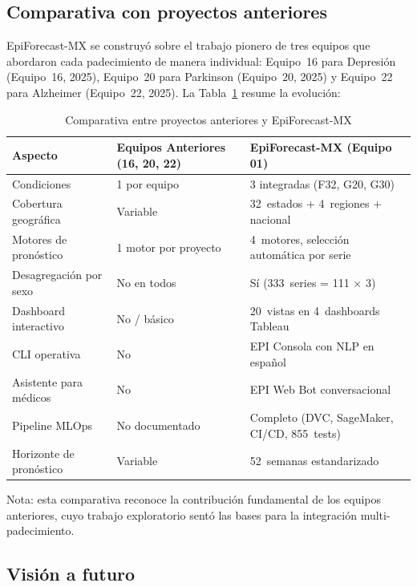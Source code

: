 \documentclass[12pt, letterpaper]{article}
\newcommand{\tabref}[1]{Tabla~\ref{#1}}
\begin{document}
\subsection{Comparativa con proyectos anteriores}

EpiForecast-MX se construyó sobre el trabajo pionero de tres equipos que abordaron cada padecimiento de manera individual: Equipo~16 para Depresión (Equipo~16, 2025), Equipo~20 para Parkinson (Equipo~20, 2025) y Equipo~22 para Alzheimer (Equipo~22, 2025). La \tabref{tab:comparativa} resume la evolución:

\begin{table}[H]
\centering
\caption{Comparativa entre proyectos anteriores y EpiForecast-MX}
\label{tab:comparativa}
\scriptsize
\setlength{\tabcolsep}{4pt}
\begin{tabularx}{\textwidth}{l X X}
\toprule
\textbf{Aspecto} & \textbf{Equipos Anteriores (16, 20, 22)} & \textbf{EpiForecast-MX (Equipo 01)} \\
\midrule
Condiciones & 1 por equipo & 3 integradas (F32, G20, G30) \\
\addlinespace
Cobertura geográfica & Variable & 32~estados + 4~regiones + nacional \\
\addlinespace
Motores de pronóstico & 1 motor por proyecto & 4~motores, selección automática por serie \\
\addlinespace
Desagregación por sexo & No en todos & Sí (333~series = 111 $\times$ 3) \\
\addlinespace
Dashboard interactivo & No / básico & 20~vistas en 4~dashboards Tableau \\
\addlinespace
CLI operativa & No & EPI Consola con NLP en español \\
\addlinespace
Asistente para médicos & No & EPI Web Bot conversacional \\
\addlinespace
Pipeline MLOps & No documentado & Completo (DVC, SageMaker, CI/CD, 855~tests) \\
\addlinespace
Horizonte de pronóstico & Variable & 52~semanas estandarizado \\
\bottomrule
\end{tabularx}
\begin{flushleft}
\scriptsize Nota: esta comparativa reconoce la contribución fundamental de los equipos anteriores, cuyo trabajo exploratorio sentó las bases para la integración multi-padecimiento.
\end{flushleft}
\end{table}

\subsection{Visión a futuro}
\end{document}

